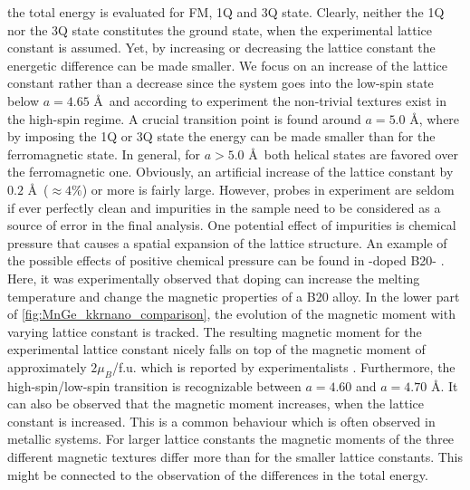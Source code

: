 \documentclass[graybox]{svmult}
\begin{document}
the total energy is evaluated for FM, 1Q and 3Q state.
Clearly, neither the 1Q nor the 3Q state constitutes the ground state,
when the experimental lattice constant is assumed.
Yet, by increasing or decreasing the lattice constant the energetic difference can be made
smaller.
We focus on an increase of the lattice constant rather than a decrease since 
the system goes into the low-spin state below $a=4.65$ \AA \, \cite{rosler_ab_2012} and according to experiment
the non-trivial textures
exist in the high-spin regime.
A crucial transition point is found around $a=5.0$ \AA,
where by imposing the 1Q or 3Q state the energy can be made smaller than for the ferromagnetic state.
In general, for $a>5.0$ \AA \, both helical states are favored over the ferromagnetic one.
Obviously, an artificial increase of the lattice constant by
$0.2$ \AA \, ($\approx 4 \%$) or more is fairly large.
However, probes in experiment are seldom if ever perfectly clean and
impurities in the sample need to be considered as a source of error in the
final analysis. One potential
effect of impurities is chemical pressure that causes a spatial expansion of the
lattice structure.
An example of the possible effects of positive chemical pressure
can be found in -doped B20- \cite{stolt_chemical_2018}. 
Here, it was experimentally observed
that doping can increase the melting temperature and change the magnetic properties of a B20 alloy.
In the lower part of \cref{fig:MnGe_kkrnano_comparison}, the evolution of the magnetic moment
with varying lattice constant is tracked.
The resulting magnetic moment for the experimental lattice constant nicely falls 
on top of the magnetic moment of approximately $2 \mu_{B}$/f.u. 
which is reported by experimentalists \cite{yaouanc_magnetic_2017}.
Furthermore, the high-spin/low-spin transition is recognizable between $a=4.60$ and $a=4.70$ \AA.
It can also be observed that the magnetic moment increases, when the lattice constant is increased.
This is a common behaviour which is often observed in metallic systems.
For larger lattice constants the magnetic moments of the three different
magnetic textures differ more than for the smaller lattice constants.
This might be connected to the observation of the differences in the total energy.
\end{document}
